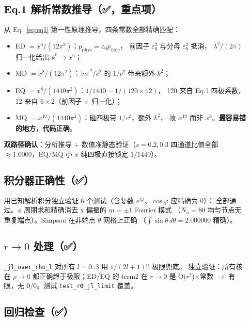 \subsection{Eq.1 解析常数推导（✅，重点项）}

从 Eq.~\eqref{eq:eq1} 第一性原理推导，四条常数全部精确匹配：

\begin{itemize}
  \item ED $=x^6/(12\pi^2)$：$p_{\mathrm{phys}}=\varepsilon_0 p_{\mathrm{tilde}}$，
        前因子 $\varepsilon_0^2$ 与分母 $\varepsilon_0^2$ 抵消，
        $\lambda^2/(2\pi)$ 归一化给出 $k^6\to x^6$；
  \item MD $=x^8/(12\pi^2)$：$|m|^2/c^2$ 的 $1/c^2$ 带来额外 $k^2$；
  \item EQ $=x^8/(1440\pi^2)$：\textbf{$1/1440=1/(120\times12)$}，
        120 来自 Eq.1 四极系数，12 来自 $6\times2$（前因子 $\times$ 归一化）；
  \item MQ $=x^{10}/(1440\pi^2)$：磁四极带 $1/c^2$，额外 $k^2$，
        故 $x^{10}$ 而非 $x^8$。\textbf{最容易错的地方，代码正确}。
\end{itemize}

\textbf{双路径确认}：分析推导 + 数值准静态验证（$s=0.2,0.3$ 四通道比值全部
$\approx1.0000$，EQ/MQ 小 $x$ 纯四极直接锁定 $1/1440$）。

\subsection{积分器正确性（✅）}

用已知解析积分独立验证 6 个测试（含复数 $e^{i\varphi}$、$\cos\varphi$ 应精确为 0）：
全部通过。$\phi$ 周期求和精确消去 x 偏振的 $m=\pm1$ Fourier 模式
（$N_\phi=80$ 均匀节点无重复端点）。Simpson 在非端点 $\theta$ 网格上正确
（$\int\sin\theta\,d\theta=2.000000$ 精确）。

\subsection{$r\to0$ 处理（✅）}

\texttt{\_jl\_over\_rho\_l} 对所有 $l=0..3$ 用 $1/(2l+1)!!$ 极限兜底。
独立验证：所有核在 $\rho\to0$ 都正确趋于极限；ED/EQ 的 term2 在 $r\to0$
是 O($r^2$)$\times$常数 $\to$ 有限，无 $0/0$。测试 \texttt{test\_r0\_jl\_limit} 覆盖。

\subsection{回归检查（✅）}

